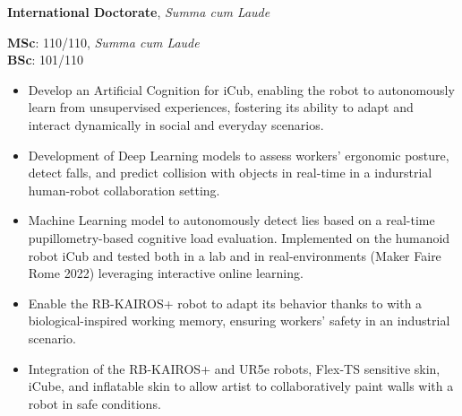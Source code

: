 

  \textbf{International Doctorate}, \textit{Summa cum Laude}   
  
  
    \divider
    
  \textbf{MSc}: 110/110, \textit{Summa cum Laude}\\\textbf{BSc}: 101/110   
  
  

    \begin{itemize}
    \item Develop an Artificial Cognition for iCub, enabling the robot to autonomously learn from unsupervised experiences, fostering its ability to adapt and interact dynamically in social and everyday scenarios.
    \end{itemize}
    \smallskip
  
    \begin{itemize}
    \item Development of Deep Learning models to assess workers' ergonomic posture, detect falls, and predict collision with objects in real-time in a indurstrial human-robot collaboration setting.
    \end{itemize}
    \smallskip
  
    \begin{itemize}
    \item Machine Learning model to autonomously detect lies based on a real-time pupillometry-based cognitive load evaluation. Implemented on the humanoid robot iCub and tested both in a lab and in real-environments (Maker Faire Rome 2022) leveraging interactive online learning.
    \end{itemize}
    \smallskip
  
    \begin{itemize}
    \item Enable the RB-KAIROS+ robot to adapt its behavior thanks to with a biological-inspired working memory, ensuring workers' safety in an industrial scenario.
    \end{itemize}
    \smallskip
  
    \begin{itemize}
    \item Integration of the RB-KAIROS+ and UR5e robots, Flex-TS sensitive skin, iCube, and inflatable skin to allow artist to collaboratively paint walls with a robot in safe conditions.
    \end{itemize}
    \smallskip
  
  